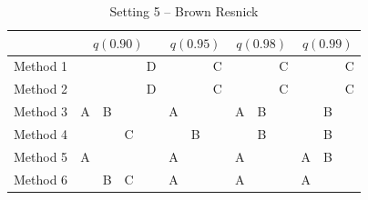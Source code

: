 \documentclass[useAMS,usenatbib,referee]{biomweb}
\begin{document}
\begin{table}[htbp]
  \centering
  \caption{Setting 5 -- Brown Resnick}
  \label{sttbl:transsim}
  \begin{tabular}{|l|cccc|ccc|ccc|ccc|}
    \cline{2-14}
    \multicolumn{1}{c}{} & \multicolumn{4}{|c}{$q(0.90)$} & \multicolumn{3}{|c}{$q(0.95)$} & \multicolumn{3}{|c}{$q(0.98)$} & \multicolumn{3}{|c|}{$q(0.99)$} \\
    \hline
    Method 1 &   &   &   & D &   &   & C &   &   & C &   &   & C \\
    \hline
    Method 2 &   &   &   & D &   &   & C &   &   & C &   &   & C \\
    \hline
    Method 3 & A & B &   &   & A &   &   & A & B &   &   & B &   \\
    \hline
    Method 4 &   &   & C &   &   & B &   &   & B &   &   & B &   \\
    \hline
    Method 5 & A &   &   &   & A &   &   & A &   &   & A & B &   \\
    \hline
    Method 6 &   & B & C &   & A &   &   & A &   &   & A &   &   \\
    \hline
  \end{tabular}
\end{table}



\end{document}

